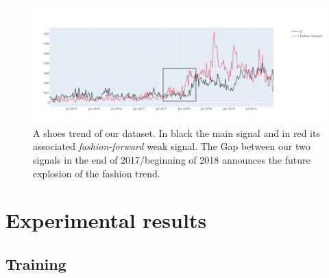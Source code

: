 \documentclass{article} %
\begin{document}
\begin{figure}
  \centering
    \includegraphics[width=1.\linewidth]{figure/emerging_trend}
  \caption{A shoes trend of our dataset. In black the main signal and in red its associated \textit{fashion-forward} weak signal. The Gap between our two signals in the end of 2017/beginning of 2018 announces the future explosion of the fashion trend.}
\label{fig:oneemergingtrend}
\end{figure}





\section{Experimental results}
\label{sec:exp}

\subsection{Training}
\end{document}
